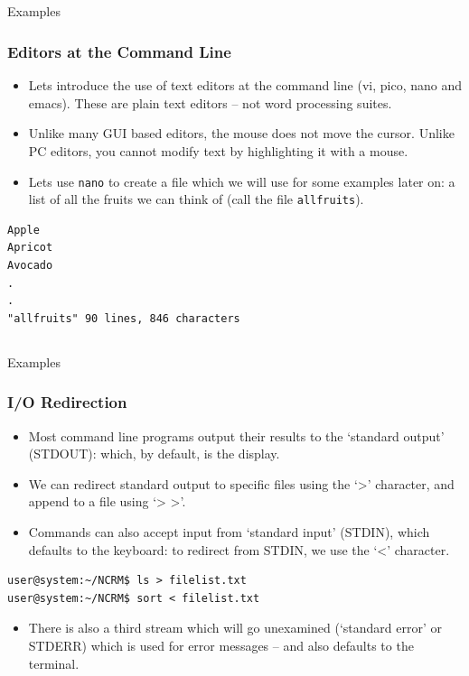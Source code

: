 \documentclass[10pt]{beamer}
\begin{document}
\subsection{}
\begin{frame}[fragile]{Examples}
\frametitle{Editors at the Command Line}
\begin{itemize}
\item Lets introduce the use of text editors at the command line (vi, pico, nano and emacs). These are plain text editors -- not word processing suites.\vspace{0.1in}
\item Unlike many GUI based editors, the mouse does not move the cursor. Unlike PC editors, you cannot modify text by highlighting it with a mouse.\vspace{0.1in}
\item Lets use \texttt{nano} to create a file which we will use for some examples later on: a list of all the fruits we can think of (call the file \texttt{allfruits}). \vspace{0.1in}
\end{itemize}
\begin{lstlisting}[style=BashInputStyle,title=Introducing Text Editors at the CLI: \texttt{nano allfruits}]
Apple
Apricot
Avocado
.
.
"allfruits" 90 lines, 846 characters
\end{lstlisting}
\end{frame}

\subsection{}
\begin{frame}[fragile]{Examples}
\frametitle{I/O Redirection}
\begin{itemize}
\item Most command line programs output their results to the ‘standard output’ (STDOUT): which, by default, is the display.
\item We can redirect standard output to specific files using the ‘>’ character, and append to a file using ‘> >’.
\item Commands can also accept input from ‘standard input’ (STDIN), which defaults to the keyboard: to redirect from STDIN, we use the ‘<’ character.
\end{itemize}
\begin{lstlisting}[style=BashInputStyle,title=STDOUT and STDIN]
user@system:~/NCRM$ ls > filelist.txt
user@system:~/NCRM$ sort < filelist.txt
\end{lstlisting}
\begin{itemize}
\item There is also a third stream which will go unexamined (‘standard error’ or STDERR) which is used for error messages – and also defaults to the terminal.
\end{itemize}
\end{frame}
\end{document}
